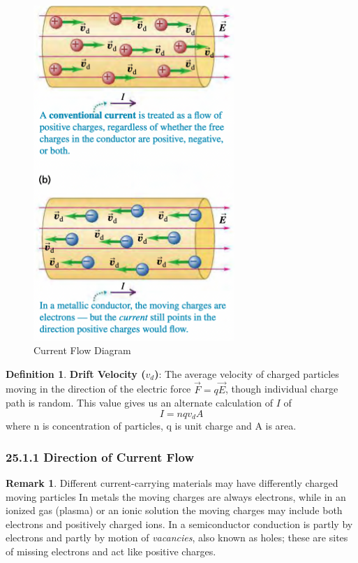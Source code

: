 \documentclass[12pt]{amsart}
\theoremstyle{definition}
\newtheorem{definition}{Definition} %
\newtheorem*{remark}{Remark}        %
\numberwithin{equation}{theorem}    %
\begin{document}
 \begin{figure}[H]
    \centering
    \includegraphics[width=3in]{Media/Current.png}
    \caption{Current Flow Diagram}
    \label{Current Flow Diagram}
\end{figure}


 \begin{definition}
    \textbf{Drift Velocity ($v_d$)}:
    The average velocity of charged particles moving in the direction of the 
    electric force $\vec{F} = q\vec{E}$, though individual charge path is random. 
    This value gives us an alternate calculation of $I$ of 
    $$I = nqv_dA$$ where n is concentration of particles, q is unit charge and A is area.
 \end{definition}

 \subsubsection*{25.1.1 Direction of Current Flow}

\begin{remark}
    Different current-carrying materials may have differently charged moving particles
    In metals the moving charges are always electrons, while in an ionized gas (plasma) or an ionic 
    solution the moving charges may include both electrons and positively charged ions.
    In a semiconductor conduction is partly by electrons and partly by motion 
    of \textit{vacancies}, also known as holes; these are sites of missing electrons 
    and act like positive charges.
\end{remark}
\end{document}
